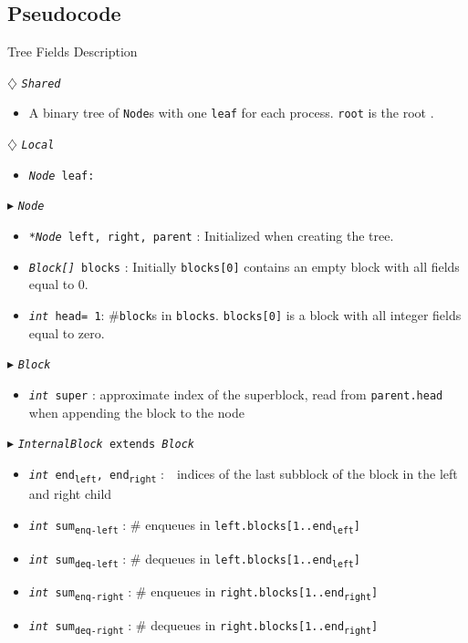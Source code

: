 \documentclass[10pt]{article}
\newcommand{\sub}[1]{\textsubscript{#1}}
\renewcommand{\tt}[1]{\texttt{#1}}
\renewcommand{\sl}[1]{\textsl{#1}}
\newcommand{\nf}[1]{{\normalfont{\texttt{#1}}}}
\newcommand{\head}{head}
\theoremstyle{definition}
\begin{document}
\subsection{Pseudocode} \label{algQ}
\begin{algorithm}
\caption{Tree Fields Description}
\begin{algorithmic}[1]
\setcounter{ALG@line}{1}
\begin{multicols}{2}

\Statex $\diamondsuit$ \tt{\sl{Shared}}
\begin{itemize}
\item \textsf{A binary tree of \tt{Node}s with one \tt{leaf} for each process. \tt{root} is the root \nf{node}.}
\end{itemize}

\Statex $\diamondsuit$ \tt{\sl{Local}}
\begin{itemize}
\item \tt{\sl{Node} leaf:} 
\end{itemize}

\Statex $\blacktriangleright$ \tt{\sl{Node}}
\begin{itemize}
\item \tt{\sl{*Node} left, right, parent} \textsf{: Initialized  when creating the tree.}
\item \tt{\sl{Block[]} blocks} \textsf{: Initially \tt{blocks[0]} contains an empty block with all fields equal to 0.}
\item \tt{\sl{int} \head= 1}\textsf{: \#\tt{block}s in \tt{blocks}. \tt{blocks[0]} is a block with all integer fields equal to zero.}
\end{itemize}

\Statex $\blacktriangleright$ \tt{\sl{Block}} 

\begin{itemize}
  \item \tt{\sl{int} super}
  \textsf{: approximate index of the superblock, read from \tt{parent.head} when appending the block to the node}
\end{itemize}

\pagebreak

\Statex $\blacktriangleright$ \tt{\sl{InternalBlock} extends \sl{Block}}
\begin{itemize}
    \item \tt{\sl{int} end\sub{left}, end\sub{right}}
  \textsf{:~~indices of the last subblock of the block in the left and right child}
  \item \tt{\sl{int} sum\sub{enq-left}}
  \textsf{: \# enqueues in \tt{left.blocks[1..end\sub{left}]}}
  \item \tt{\sl{int} sum\sub{deq-left}}
  \textsf{: \# dequeues in \tt{left.blocks[1..end\sub{left}]}}
  \item \tt{\sl{int} sum\sub{enq-right}}
  \textsf{: \# enqueues in \tt{right.blocks[1..end\sub{right}]}}
  \item \tt{\sl{int} sum\sub{deq-right}}
  \textsf{: \# dequeues in \tt{right.blocks[1..end\sub{right}]}}
\end{itemize}


\end{multicols}
\end{algorithmic}
\end{algorithm}
\end{document}
